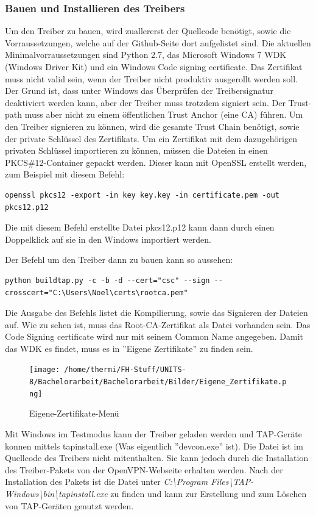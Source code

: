 {\subsubsection{Bauen und Installieren des Treibers}
Um den Treiber zu bauen, wird zuallererst der Quellcode benötigt, sowie die
Vorraussetzungen, welche auf der Github-Seite dort aufgelistet sind.
Die aktuellen Minimalvorraussetzungen sind Python 2.7, das Microsoft Windows 7 WDK (Windows Driver Kit)
und ein Windows Code signing certificate.
Das Zertifikat muss nicht valid sein, wenn der Treiber nicht produktiv ausgerollt
werden soll. Der Grund ist, dass unter Windows das Überprüfen der Treibersignatur deaktiviert
werden kann, aber der Treiber muss trotzdem signiert sein. Der Trust-path muss aber nicht
zu einem öffentlichen Trust Anchor (eine CA) führen. Um den Treiber signieren zu können,
wird die gesamte Trust Chain benötigt, sowie der private Schlüssel des Zertifikats.
Um ein Zertifikat mit dem dazugehörigen privaten Schlüssel importieren zu können,
müssen die Dateien in einen PKCS\#12-Container gepackt werden. Dieser kann mit 
OpenSSL erstellt werden, zum Beispiel mit diesem Befehl:
\begin{lstlisting}[caption=OpenSSL PKCS\#12]
openssl pkcs12 -export -in key key.key -in certificate.pem -out pkcs12.p12
\end{lstlisting}
Die mit diesem Befehl erstellte Datei pkcs12.p12 kann dann durch einen Doppelklick auf sie
in den Windows importiert werden.

Der Befehl um den Treiber dann zu bauen kann so aussehen:
\begin{lstlisting}[caption=TAP-Windows bauen]
python buildtap.py -c -b -d --cert="csc" --sign --crosscert="C:\Users\Noel\certs\rootca.pem"
\end{lstlisting}
Die Ausgabe des Befehls listet die Kompilierung, sowie das Signieren der Dateien auf.
Wie zu sehen ist, muss das Root-CA-Zertifikat als Datei vorhanden sein.
Das Code Signing certificate wird nur mit seinem Common Name angegeben.
Damit das WDK es findet, muss es in ''Eigene Zertifikate'' zu finden sein.
\begin{figure}
\texttt{[image: /home/thermi/FH-Stuff/UNITS-8/Bachelorarbeit/Bachelorarbeit/Bilder/Eigene\_Zertifikate.png]}
\caption{Eigene-Zertifikate-Menü}
\label{fig:Eigene-Zertifikate-Menue}
\end{figure}

Mit Windows im Testmodus kann der Treiber geladen werden und TAP-Geräte konnen
mittels tapinstall.exe (Was eigentlich ''devcon.exe'' ist). Die Datei ist im Quellcode des
Treibers nicht mitenthalten. Sie kann jedoch durch die Installation des Treiber-Pakets
von der OpenVPN-Webseite erhalten werden. Nach der Installation des Pakets
ist die Datei unter \textit{C:\textbackslash{}Program Files\textbackslash{}TAP-Windows\textbackslash{}bin\textbackslash{}tapinstall.exe}
zu finden und kann zur Erstellung und zum Löschen von TAP-Geräten genutzt werden.

}
